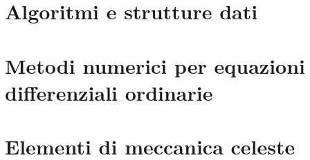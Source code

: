 \documentclass{book}
\begin{document}
	\chapter{Algoritmi e strutture dati}
	
	\chapter{Metodi numerici per equazioni differenziali ordinarie}
	
	\chapter{Elementi di meccanica celeste}
	
	\cleardoublepage
	\listoffigures
	\cleardoublepage
	\listoftables
	\cleardoublepage
	\listoflistings
	\cleardoublepage
	\printindex
\end{document}
